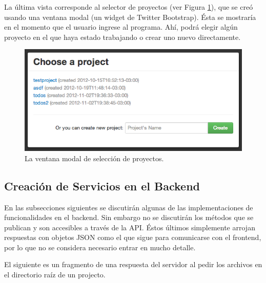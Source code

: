 \documentclass[12pt,spanish,letter]{report}
\makeatletter
\def\maxwidth{\ifdim\Gin@nat@width>\linewidth\linewidth
\else\Gin@nat@width\fi}
\let\Oldincludegraphics\includegraphics
\renewcommand{\includegraphics}[1]{\Oldincludegraphics[width=\maxwidth]{#1}}
\makeatother
\begin{document}
La última vista corresponde al selector de proyectos (ver Figura
\ref{figures:projects-view}), que se creó usando una ventana modal (un
widget de Twitter Bootstrap). Ésta se mostraría en el momento que el
usuario ingrese al programa. Ahí, podrá elegir algún proyecto en el que
haya estado trabajando o crear uno nuevo directamente.

\begin{figure}[htbp]
\centering
\includegraphics{figures/projects-view.png}
\caption{La ventana modal de selección de proyectos.
\label{figures:projects-view}}
\end{figure}

\subsection{Creación de Servicios en el Backend}

\label{section:create-services}

En las subsecciones siguientes se discutirán algunas de las
implementaciones de funcionalidades en el backend. Sin embargo no se
discutirán los métodos que se publican y son accesibles a través de la
API. Éstos últimos simplemente arrojan respuestas con objetos JSON como
el que sigue para comunicarse con el frontend, por lo que no se
considera necesario entrar en mucho detalle.

El siguiente es un fragmento de una respuesta del servidor al pedir los
archivos en el directorio raíz de un projecto.
\end{document}
